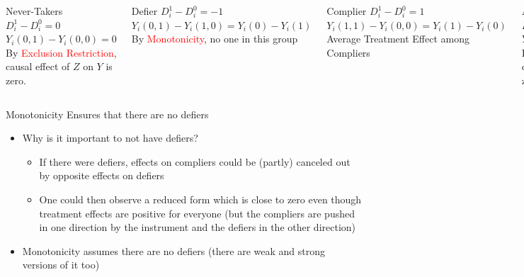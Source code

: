 \documentclass{beamer}
\begin{document}
\begin{frame}[plain]
  \begin{columns}[t]
    \scriptsize
    \begin{block}{Never-Takers}
      $D^1_i - D^0_i = 0$ \\
      $Y_i(0,1) - Y_i(0,0) = 0$ \\
      By \textcolor{red}{Exclusion Restriction}, causal effect of $Z$ on $Y$ is zero.
    \end{block}
    \begin{block}{Defier}
      $D^1_i - D^0_i = -1$ \\
      $Y_i(0,1) - Y_i(1,0) = Y_i(0) - Y_i(1)$ \\
      By \textcolor{red}{Monotonicity}, no one in this group
    \end{block}
    \begin{block}{Complier}
      $D^1_i - D^0_i = 1$ \\
      $Y_i(1,1) - Y_i(0,0) = Y_i(1) - Y_i(0)$ \\
      Average Treatment Effect among Compliers
    \end{block}
    \begin{block}{Always-taker}
      $D^1_i - D^0_i = 0$ \\
      $Y_i(1,1) - Y_i(1,0) = 0$ \\
      By \textcolor{red}{Exclusion Restriction}, causal effect of $Z$ on $Y$ is zero.
    \end{block}
  \end{columns}
\end{frame}


\begin{frame}{Monotonicity Ensures that there are no defiers}

  \begin{itemize}
    \item Why is it important to not have defiers?
          \begin{itemize}
            \item If there were defiers, effects on compliers could be (partly) canceled out by opposite effects on defiers
            \item One could then observe a reduced form which is close to zero even though treatment effects are positive for everyone (but the compliers are pushed in one direction by the instrument and the defiers in the other direction)
          \end{itemize}
    \item Monotonicity assumes there are no defiers (there are weak and strong versions of it too)
  \end{itemize}

\end{frame}
\end{document}
